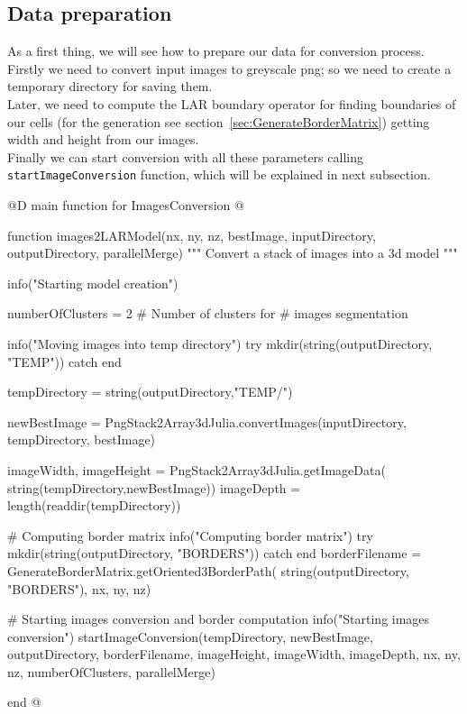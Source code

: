 \documentclass[11pt,oneside]{article}	%
\begin{document}
\subsection{Data preparation}\label{sec:ImagesConversionDataPreparation}
As a first thing, we will see how to prepare our data for conversion process. Firstly we need to convert input images to greyscale png; so we need to create a temporary directory for saving them.\\
Later, we need to compute the LAR boundary operator for finding boundaries of our cells (for the generation see section~\ref{sec:GenerateBorderMatrix}) getting width and height from our images.\\
Finally we can start conversion with all these parameters calling \texttt{startImageConversion} function, which will be explained in next subsection.

@D main function for ImagesConversion
@{function images2LARModel(nx, ny, nz, bestImage,
			inputDirectory, outputDirectory, parallelMerge)
  """
  Convert a stack of images into a 3d model
  """

  info("Starting model creation")

  numberOfClusters = 2 # Number of clusters for
                       # images segmentation

  info("Moving images into temp directory")
  try
    mkdir(string(outputDirectory, "TEMP"))
  catch
  end

  tempDirectory = string(outputDirectory,"TEMP/")

  newBestImage = PngStack2Array3dJulia.convertImages(inputDirectory, tempDirectory,
							bestImage)

  imageWidth, imageHeight = PngStack2Array3dJulia.getImageData(
				      string(tempDirectory,newBestImage))
  imageDepth = length(readdir(tempDirectory))

  # Computing border matrix
  info("Computing border matrix")
  try
    mkdir(string(outputDirectory, "BORDERS"))
  catch
  end
  borderFilename = GenerateBorderMatrix.getOriented3BorderPath(
					string(outputDirectory, "BORDERS"), nx, ny, nz)

  # Starting images conversion and border computation
  info("Starting images conversion")
  startImageConversion(tempDirectory, newBestImage, outputDirectory, borderFilename,
                       imageHeight, imageWidth, imageDepth,
                       nx, ny, nz,
                       numberOfClusters, parallelMerge)

end
@}
\end{document}
